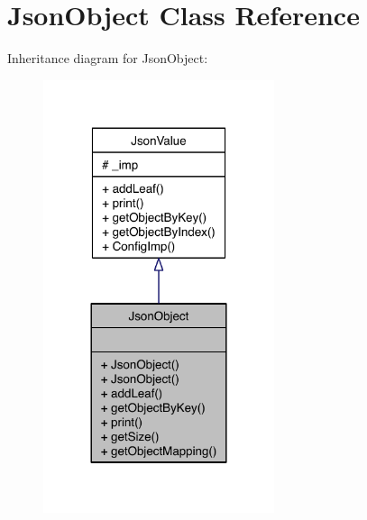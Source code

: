 \hypertarget{class_json_object}{\section{Json\-Object Class Reference}
\label{class_json_object}
}


Inheritance diagram for Json\-Object\-:
\nopagebreak
\begin{figure}[H]
\begin{center}
\leavevmode
\includegraphics[width=192pt]{class_json_object__inherit__graph}
\end{center}
\end{figure}



